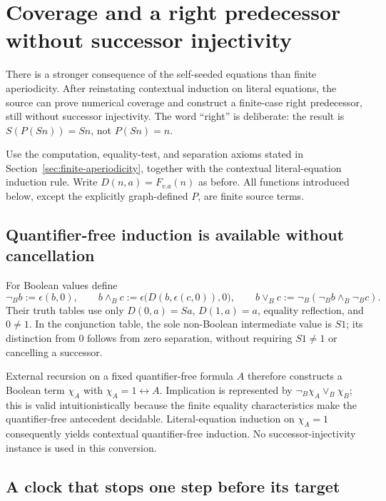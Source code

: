 \section{Coverage and a right predecessor without successor injectivity}
\label{sec:right-predecessor}

There is a stronger consequence of the self-seeded equations than finite
aperiodicity. After reinstating contextual induction on literal equations,
the source can prove numerical coverage and construct a finite-case
right predecessor, still without successor injectivity. The word
``right'' is deliberate: the result is $S(P(Sn))=Sn$, not $P(Sn)=n$.

Use the computation, equality-test, and separation axioms stated in
Section~\ref{sec:finite-aperiodicity}, together with the contextual
literal-equation induction rule. Write $D(n,a)=F_{v.a}(n)$ as before.
All functions introduced below, except the explicitly graph-defined $P$,
are finite source terms.

\subsection{Quantifier-free induction is available without cancellation}

For Boolean values define
\[
 \neg_B b:=\epsilon(b,0),\qquad
 b\land_B c:=\epsilon\bigl(D(b,\epsilon(c,0)),0\bigr),\qquad
 b\lor_B c:=\neg_B(\neg_B b\land_B\neg_B c).
\]
Their truth tables use only $D(0,a)=Sa$, $D(1,a)=a$, equality reflection,
and $0\ne1$. In the conjunction table, the sole non-Boolean intermediate
value is $S1$; its distinction from $0$ follows from zero separation,
without requiring $S1\ne1$ or cancelling a successor.

External recursion on a fixed quantifier-free formula $A$ therefore
constructs a Boolean term $\chi_A$ with $\chi_A=1\leftrightarrow A$.
Implication is represented by $\neg_B\chi_A\lor_B\chi_B$; this is valid
intuitionistically because the finite equality characteristics make the
quantifier-free antecedent decidable. Literal-equation induction on
$\chi_A=1$ consequently yields contextual quantifier-free induction.
No successor-injectivity instance is used in this conversion.

\subsection{A clock that stops one step before its target}

